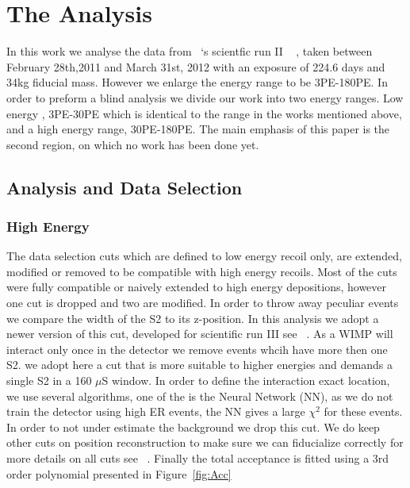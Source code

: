 \section{The Analysis}
\label{sec:Analysis}
In this work we analyse the data from \Xehund\ `s scientfic run II ~\cite{xe100_run10_si,xe100_run10_sd} , taken between February 28th,2011 and March 31st, 2012 with an exposure of 224.6 days and 34kg fiducial mass.  However we enlarge the energy range to be 3PE-180PE. In order to preform a blind analysis we divide our work into two energy ranges. Low energy , 3PE-30PE which is identical to the range in the works mentioned above, and a high energy range, 30PE-180PE. The main emphasis of this paper is the second region, on which no work has been done yet.

\subsection{Analysis and Data Selection}
\label{subsec:AnalysisAndDataSelection}
\subsubsection{High Energy}
\label{subsubsec:HighE}

The data selection cuts which are defined to low energy recoil only, are extended, modified or removed to be compatible with high energy recoils. Most of the cuts were fully compatible or naively extended to high energy depositions, however one cut is dropped and two are modified. In order to throw away peculiar events we compare the width of the S2 to its z-position. In this analysis we adopt a newer version of this cut, developed for scientific run III see ~\cite{xe100_run_combination}. As a WIMP will interact only once in the detector we remove events whcih have more then one S2. we adopt here a cut that is more suitable to higher energies and demands a single S2 in a 160 $\mu$S window. In order to define the interaction exact location, we use several algorithms, one of the is the Neural Network (NN), as we do not train the detector using high ER events, the NN gives a large $\chi^2$ for these events. In order to not under estimate the background we drop this cut. We do keep other cuts on position reconstruction to make sure we can fiducialize correctly for more details on all cuts see ~\cite{xe100_ana2012}. Finally the total acceptance is fitted using a 3rd order polynomial presented in Figure~\ref{fig:Acc}

